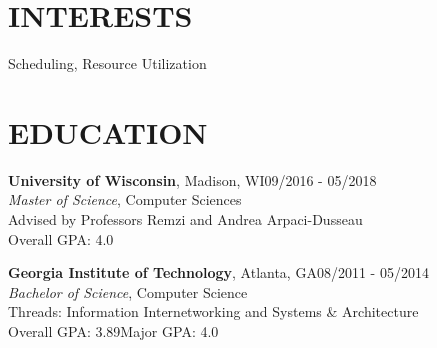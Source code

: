 \documentclass[margin,11pt]{res}
\begin{document}


\address{US Citizen}
\address{dennisszhou@gmail.com $\bullet$ 651-442-8757}


\begin{resume}
\section{INTERESTS}
Scheduling, Resource Utilization


\section{EDUCATION}
\textbf{University of Wisconsin}, Madison, WI\hfill 09/2016 - 05/2018\\
{\sl Master of Science}, Computer Sciences\\
Advised by Professors Remzi and Andrea Arpaci-Dusseau\\
Overall GPA: 4.0

\textbf{Georgia Institute of Technology}, Atlanta, GA\hfill 08/2011 - 05/2014\\
{\sl Bachelor of Science}, Computer Science\\
Threads: Information Internetworking and Systems \& Architecture\\
Overall GPA: 3.89\hspace{10mm}Major GPA: 4.0


\end{resume}
\end{document}

